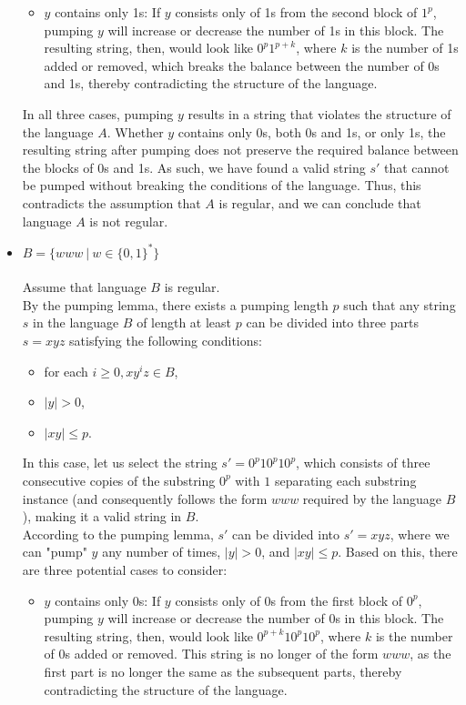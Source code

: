\documentclass[12pt]{article}
\begin{document}
\begin{itemize}
\begin{itemize}
    \item $y$ contains only 1s: If $y$ consists only of 1s from the second block of $1^p$, pumping $y$ will increase or decrease the number of 1s in this block. The resulting string, then, would look like $0^p1^{p+k}$, where $k$ is the number of 1s added or removed, which breaks the balance between the number of 0s and 1s, thereby contradicting the structure of the language.
\end{itemize}

In all three cases, pumping $y$ results in a string that violates the structure of the language $A$. Whether $y$ contains only 0s, both 0s and 1s, or only 1s, the resulting string after pumping does not preserve the required balance between the blocks of 0s and 1s. As such, we have found a valid string $s'$ that cannot be pumped without breaking the conditions of the language. Thus, this contradicts the assumption that $A$ is regular, and we can conclude that language $A$ is not regular.

	\item $B= \{ www \ | \ w \in \{0,1\}^* \}$\\
\\
Assume that language $B$ is regular.\\

By the pumping lemma, there exists a pumping length $p$ such that any string $s$ in the language $B$ of length at least $p$ can be divided into three parts $s = xyz$ satisfying the following conditions:
\begin{itemize}
    \item for each $i \geq 0, xy^iz \in B$,
    \item $|y| > 0$,
    \item $|xy| \leq p$.
\end{itemize}

In this case, let us select the string $s' = 0^p10^p10^p$, which consists of three consecutive copies of the substring $0^p$ with $1$ separating each substring instance (and consequently follows the form $www$ required by the language $B$), making it a valid string in $B$.\\

According to the pumping lemma, $s'$ can be divided into $s' = xyz$, where we can "pump" $y$ any number of times, $|y| > 0$, and $|xy| \leq p$. Based on this, there are three potential cases to consider:

\begin{itemize}
    \item $y$ contains only 0s: If $y$ consists only of 0s from the first block of $0^p$, pumping $y$ will increase or decrease the number of 0s in this block. The resulting string, then, would look like $0^{p+k}10^p10^p$, where $k$ is the number of 0s added or removed. This string is no longer of the form $www$, as the first part is no longer the same as the subsequent parts, thereby contradicting the structure of the language.
    

\end{itemize}
\end{itemize}
\end{document}

